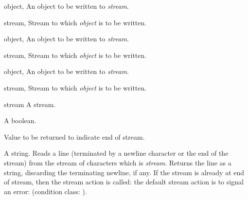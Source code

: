 \begin{optDefinition}
\begin{specargs}
    \item[object, \classref{object}] An object to be written to {\em stream}.
    \item[stream, \classref{stream}] Stream to which {\em object\/} is to be written.
\end{specargs}

\begin{specargs}
    \item[object, \classref{object}] An object to be written to {\em stream}.
    \item[stream, \classref{buffered-stream}] Stream to which {\em object\/} is
    to be written.
\end{specargs}

\begin{specargs}
    \item[object, \classref{object}] An object to be written to {\em stream}.
    \item[stream, \classref{file-stream}] Stream to which {\em object\/} is
    to be written.
\end{specargs}


\begin{arguments}
    \item[stream] A stream.
    \item[\optional{eos-error-p}] A boolean.
    \item[\optional{eos-value}] Value to be returned to indicate end of stream.
\end{arguments}
%
\result%
A string.
%
\remarks%
Reads a line (terminated by a newline character or the end of the
stream) from the stream of characters which is {\em stream}.  Returns
the line as a string, discarding the terminating newline, if any.  If
the stream is already at end of stream, then the stream action is
called: the default stream action is to signal an error: (condition
class: ).


\end{optDefinition}
